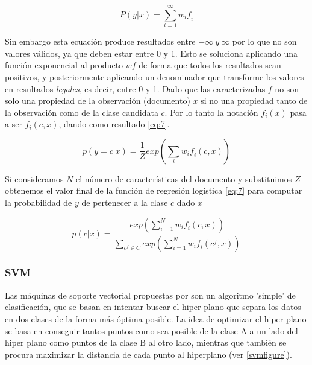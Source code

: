 \begin{equation}\label{eq:6}
\mathit{P(y|x) = \sum_{i=1}^{\infty} w_if_i}
\end{equation}

Sin embargo esta ecuación produce resultados entre \(-\infty\ y\ \infty\) por lo que no son valores válidos, ya que deben estar entre 0 y 1. Esto se soluciona aplicando una función exponencial al producto \(wf\) de forma que todos los resultados sean positivos, y posteriormente aplicando un denominador que transforme los valores en resultados \emph{legales}, es decir, entre 0 y 1.
Dado que las caracterizadas \(f\) no son solo una propiedad de la observación (documento) \(x\) si no una propiedad tanto de la observación como de la clase candidata \(c\). Por lo tanto la notación \(f_i(x)\) pasa a ser \(f_i(c,x)\), dando como resultado \ref{eq:7}.

\begin{equation}\label{eq:7}
\mathit{p(y = c|x) = \frac{1}{Z}exp(\sum_{i}w_if_i(c,x))}
\end{equation}

Si consideramos \(N\) el número de características del documento y substituimos \(Z\) obtenemos el valor final de la función de regresión logística \ref{eq:7} para computar la probabilidad de \(y\) de pertenecer a la clase \(c\) dado \(x\)

\begin{equation}
\mathit{p(c|x)=\frac{exp(\sum_{i=1}^{N}w_if_i(c,x))}{\sum_{c^f \in C}exp(\sum_{i=1}^{N}w_if_i(c^f,x))}}
\end{equation}

\subsubsection{SVM}\label{svm}

Las máquinas de soporte vectorial propuestas por \cite{svmbib} son un algoritmo 'simple' de clasificación, que se basan en intentar buscar el hiper plano que separa los datos en dos clases de la forma más óptima posible. La idea de optimizar el hiper plano se basa en conseguir tantos puntos como sea posible de la clase A a un lado del hiper plano como puntos de la clase B al otro lado, mientras que también se procura maximizar la distancia de cada punto al hiperplano (ver \ref{svmfigure}).

